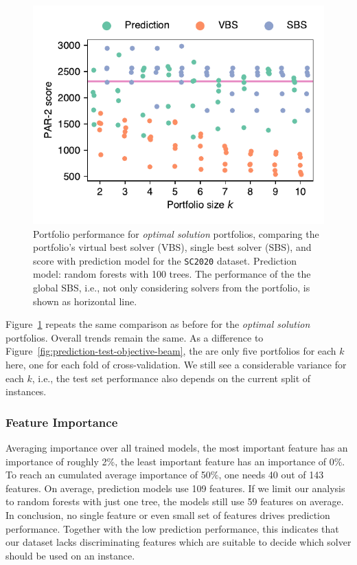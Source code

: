 \documentclass[conference]{IEEEtran}
\begin{document}
\begin{figure}[t]
	\centering
	\includegraphics[width=0.98\columnwidth]{plots/prediction-test-objective-optimal-2020.pdf}
	\caption{
		Portfolio performance for \emph{optimal solution} portfolios, comparing the portfolio's virtual best solver (VBS), single best solver (SBS), and score with prediction model for the \texttt{SC2020} dataset.
		Prediction model: random forests with 100 trees.
		The performance of the the global SBS, i.e., not only considering solvers from the portfolio, is shown as horizontal line.
	}
	\label{fig:prediction-test-objective-optimal-2020}
\end{figure}

Figure~\ref{fig:prediction-test-objective-optimal-2020} repeats the same comparison as before for the \emph{optimal solution} portfolios.
Overall trends remain the same.
As a difference to Figure~\ref{fig:prediction-test-objective-beam}, the are only five portfolios for each $k$ here, one for each fold of cross-validation.
We still see a considerable variance for each $k$, i.e., the test set performance also depends on the current split of instances.

\subsubsection{Feature Importance}

Averaging importance over all trained models, the most important feature has an importance of roughly 2\%, the least important feature has an importance of 0\%.
To reach an cumulated average importance of 50\%, one needs 40 out of 143 features.
On average, prediction models use 109 features.
If we limit our analysis to random forests with just one tree, the models still use 59 features on average.
In conclusion, no single feature or even small set of features drives prediction performance.
Together with the low prediction performance, this indicates that our dataset lacks discriminating features which are suitable to decide which solver should be used on an instance.
\end{document}
